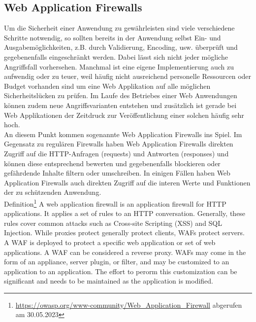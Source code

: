 \subsection{Web Application Firewalls}
Um die Sicherheit einer Anwendung zu gewährleisten sind viele verschiedene Schritte notwendig, so sollten bereits in der Anwendung selbst Ein- und Ausgabemöglichkeiten, z.B. durch Validierung, Encoding, usw. überprüft und gegebenenfalls eingeschränkt werden. Dabei lässt sich nicht jeder mögliche Angriffsfall vorhersehen. Manchmal ist eine eigene Implementierung auch zu aufwendig oder zu teuer, weil häufig nicht ausreichend personelle Ressourcen oder Budget vorhanden sind um eine Web Applikation auf alle möglichen Sicherheitslücken zu prüfen. Im Laufe des Betriebes einer Web Anwendungen können zudem neue Angriffsvarianten entstehen und zusätzlich ist gerade bei Web Applikationen der Zeitdruck zur Veröffentlichung einer solchen häufig sehr hoch.\\

An diesem Punkt kommen sogenannte Web Application Firewalls ins Spiel. Im Gegensatz zu regulären Firewalls haben Web Application Firewalls direkten Zugriff auf die HTTP-Anfragen (requests) und Antworten (responses) und können diese entsprechend bewerten und gegebenenfalls blockieren oder gefährdende Inhalte filtern oder umschreiben. In einigen Fällen haben Web Application Firewalls auch direkten Zugriff auf die interen Werte und Funktionen der zu schützenden Anwendung.\\

\textcolor{bhtGray}{ Definition\footnote{\url{https://owasp.org/www-community/Web_Application_Firewall} abgerufen am 30.05.2023}} A web application firewall is an application firewall for HTTP applications. It applies a set of rules to an HTTP conversation. Generally, these rules cover common attacks such as Cross-site Scripting (XSS) and SQL Injection. While proxies protect generally protect clients, WAFs protect servers. A WAF is deployed to protect a specific web application or set of web applications. A WAF can be considered a reverse proxy. WAFs may come in the form of an appliance, server plugin, or filter, and may be customized to an application to an application. The effort to perorm this customization can be significant and needs to be maintained as the application is modified.


